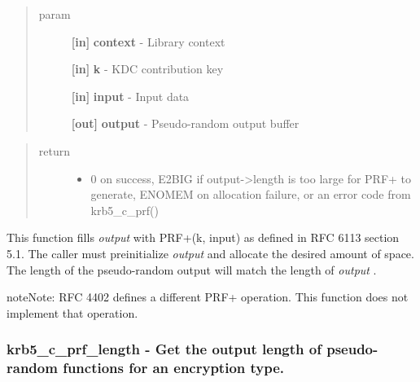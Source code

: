 \documentclass[letterpaper,10pt,english]{sphinxmanual}
\begin{document}
\begin{quote}\begin{description}
\item[{param}] \leavevmode
\textbf{{[}in{]}} \textbf{context} - Library context

\textbf{{[}in{]}} \textbf{k} - KDC contribution key

\textbf{{[}in{]}} \textbf{input} - Input data

\textbf{{[}out{]}} \textbf{output} - Pseudo-random output buffer

\end{description}\end{quote}
\begin{quote}\begin{description}
\item[{return}] \leavevmode\begin{itemize}
\item {} 
0 on success, E2BIG if output-\textgreater{}length is too large for PRF+ to generate, ENOMEM on allocation failure, or an error code from krb5\_c\_prf()

\end{itemize}

\end{description}\end{quote}

This function fills \emph{output} with PRF+(k, input) as defined in RFC 6113 section 5.1. The caller must preinitialize \emph{output} and allocate the desired amount of space. The length of the pseudo-random output will match the length of \emph{output} .

\begin{notice}{note}{Note:}
RFC 4402 defines a different PRF+ operation. This function does not implement that operation.
\end{notice}


\subsubsection{krb5\_c\_prf\_length -  Get the output length of pseudo-random functions for an encryption type.}
\label{appdev/refs/api/krb5_c_prf_length::doc}\label{appdev/refs/api/krb5_c_prf_length:krb5-c-prf-length-get-the-output-length-of-pseudo-random-functions-for-an-encryption-type}

\begin{fulllineitems}
\label{appdev/refs/api/krb5_c_prf_length:c.krb5_c_prf_length}
\end{fulllineitems}
\end{document}
